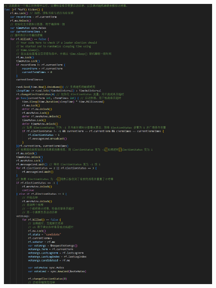\documentclass[]{article}
\begin{document}
\begin{itemize}
\begin{figure}[H]
			\includegraphics[height=1\textheight]{./2A/ticker1.png}
		\end{figure}
		\begin{figure}[H]
			\centering

\end{figure}
\end{itemize}
\end{document}
